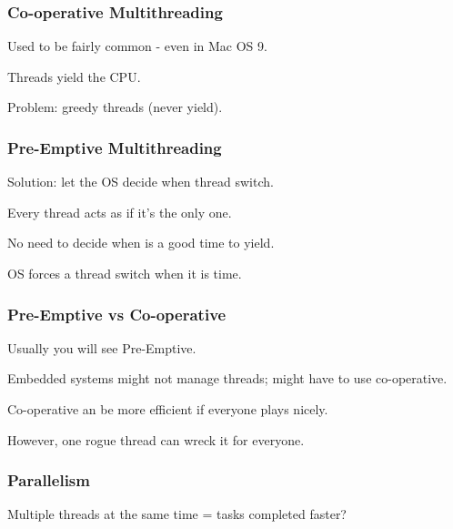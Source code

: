 \begin{frame}
\frametitle{Co-operative Multithreading}
\begin{changemargin}{1cm}

Used to be fairly common - even in Mac OS 9.

Threads yield the CPU.

Problem: greedy threads (never yield). 

\end{changemargin}
\end{frame}

\begin{frame}
\frametitle{Pre-Emptive Multithreading}
\begin{changemargin}{1cm}

Solution: let the OS decide when thread switch.

Every thread acts as if it's the only one.

No need to decide when is a good time to yield.

OS forces a thread switch when it is time.

\end{changemargin}
\end{frame}

\begin{frame}
\frametitle{Pre-Emptive vs Co-operative}
\begin{changemargin}{1cm}

Usually you will see Pre-Emptive.

Embedded systems might not manage threads; might have to use co-operative.

Co-operative an be more efficient if everyone plays nicely.

However, one rogue thread can wreck it for everyone.

\end{changemargin}
\end{frame}

\begin{frame}
\frametitle{Parallelism}
\begin{changemargin}{1cm}

Multiple threads at the same time = tasks completed faster?

\end{changemargin}
\end{frame}

